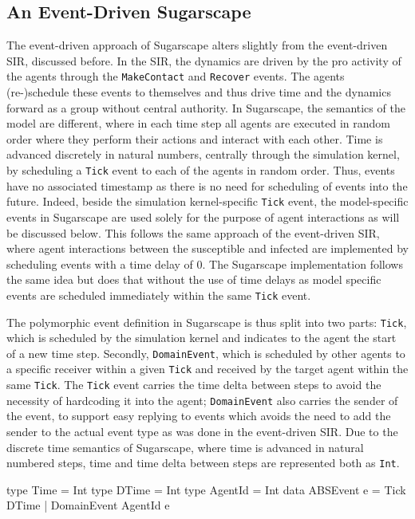 \subsection{An Event-Driven Sugarscape}
The event-driven approach of Sugarscape alters slightly from the event-driven SIR, discussed before. In the SIR, the dynamics are driven by the pro activity of the agents through the \texttt{MakeContact} and \texttt{Recover} events. The agents (re-)schedule these events to themselves and thus drive time and the dynamics forward as a group without central authority. In Sugarscape, the semantics of the model are different, where in each time step all agents are executed in random order where they perform their actions and interact with each other. Time is advanced discretely in natural numbers, centrally through the simulation kernel, by scheduling a \texttt{Tick} event to each of the agents in random order. Thus, events have no associated timestamp as there is no need for scheduling of events into the future. Indeed, beside the simulation kernel-specific \texttt{Tick} event, the model-specific events in Sugarscape are used solely for the purpose of agent interactions as will be discussed below. This follows the same approach of the event-driven SIR, where agent interactions between the susceptible and infected are implemented by scheduling events with a time delay of 0. The Sugarscape implementation follows the same idea but does that without the use of time delays as model specific events are scheduled immediately within the same \texttt{Tick} event.

The polymorphic event definition in Sugarscape is thus split into two parts: \texttt{Tick}, which is scheduled by the simulation kernel and indicates to the agent the start of a new time step. Secondly, \texttt{DomainEvent}, which is scheduled by other agents to a specific receiver within a given \texttt{Tick} and received by the target agent within the same \texttt{Tick}. The \texttt{Tick} event carries the time delta between steps to avoid the necessity of hardcoding it into the agent; \texttt{DomainEvent} also carries the sender of the event, to support easy replying to events which avoids the need to add the sender to the actual event type as was done in the event-driven SIR. Due to the discrete time semantics of Sugarscape, where time is advanced in natural numbered steps, time and time delta between steps are represented both as \texttt{Int}.

\begin{HaskellCode}
type Time       = Int
type DTime      = Int
type AgentId    = Int
data ABSEvent e = Tick DTime 
                | DomainEvent AgentId e
\end{HaskellCode}

